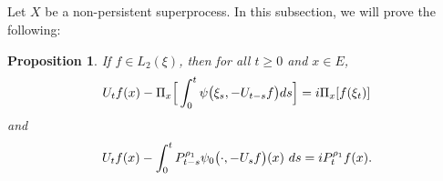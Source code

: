 \documentclass[12pt,a4paper]{amsart}
\theoremstyle{plain}
\newtheorem{prop}[thm]{Proposition}
\theoremstyle{definition}
\numberwithin{equation}{section}
\begin{document}
\subsection{}
    Let $X$ be a non-persistent superprocess.
    In this subsection, we will prove the following:
    \begin{prop}
\label{prop: complex FKPP-equation}
    If $f\in L_2(\xi)$,  then for all $t\geq 0$ and $x\in E$,
\begin{equation}
\label{eq: complex FKPP-equation}
    U_tf(x) - \Pi_x \Big[\int_0^t \psi\big(\xi_s, - U_{t-s}f\big) ds \Big]
    \\= i \Pi_x [f(\xi_t)]
\end{equation}
and
\begin{equation}
\label{eq: complex FKPP-equation with FK-transform}
    U_tf(x) -  \int_0^t P_{t-s}^{\rho_1} \psi_0\big(\cdot,-U_sf\big) (x)~ds
      \\= iP_t^{\rho_1} f(x).
\end{equation}
\end{prop}
\end{document}

